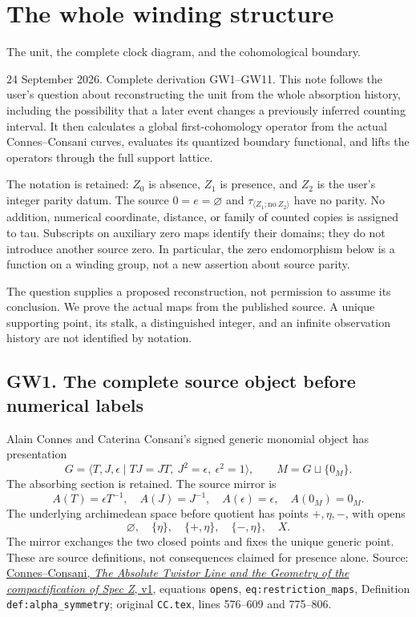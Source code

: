 

\section{The whole winding structure}\label{gw20260924-the-whole-winding-structure}

The unit, the complete clock diagram, and the cohomological boundary.

24 September 2026. Complete derivation GW1--GW11. This note follows the
user's question about reconstructing the unit from the whole absorption
history, including the possibility that a later event changes a
previously inferred counting interval. It then calculates a global
first-cohomology operator from the actual Connes--Consani curves,
evaluates its quantized boundary functional, and lifts the operators
through the full support lattice.

The notation is retained: \(Z_0\) is absence, \(Z_1\) is presence, and
\(Z_2\) is the user's integer parity datum. The source
\(0=e=\varnothing\) and \(\tau_{\langle Z_1;\mathrm{no}\ Z_2\rangle}\)
have no parity. No addition, numerical coordinate, distance, or family
of counted copies is assigned to tau. Subscripts on auxiliary zero maps
identify their domains; they do not introduce another source zero. In
particular, the zero endomorphism below is a function on a winding
group, not a new assertion about source parity.

The question supplies a proposed reconstruction, not permission to
assume its conclusion. We prove the actual maps from the published
source. A unique supporting point, its stalk, a distinguished integer,
and an infinite observation history are not identified by notation.

\subsection{GW1. The complete source object before numerical
labels}\label{gw20260924-gw1.-the-complete-source-object-before-numerical-labels}

Alain Connes and Caterina Consani's signed generic monomial object has
presentation \[
G=\langle T,J,\epsilon\mid TJ=JT,\ J^2=\epsilon,\ \epsilon^2=1\rangle,
\qquad M=G\sqcup\{0_M\}.
\tag{GW1.1}
\] The absorbing section is retained. The source mirror is \[
A(T)=\epsilon T^{-1},\quad A(J)=J^{-1},\quad A(\epsilon)=\epsilon,
\quad A(0_M)=0_M.
\tag{GW1.2}
\] The underlying archimedean space before quotient has points
\(+,\eta,-\), with opens \[
\varnothing,\quad\{\eta\},\quad\{+,\eta\},\quad\{-,\eta\},\quad X.
\] The mirror exchanges the two closed points and fixes the unique
generic point. These are source definitions, not consequences claimed
for presence alone. Source:
\href{https://arxiv.org/html/2609.00299v1}{Connes--Consani, \emph{The
Absolute Twistor Line and the Geometry of the compactification of Spec
Z}, v1}, equations \texttt{opens}, \texttt{eq:restriction\_maps},
Definition \texttt{def:alpha\_symmetry}; original \nolinkurl{CC.tex}, lines
576--609 and 775--806.

